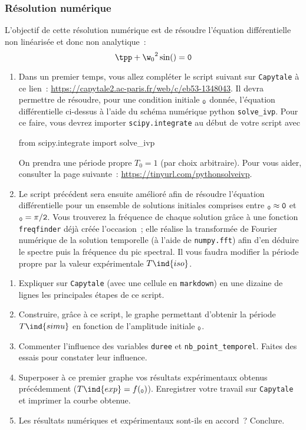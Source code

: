 \documentclass[a4paper, 11pt, final, garamond]{book}
\begin{document}
\subsubsection{Résolution numérique}

L'objectif de cette résolution numérique est de résoudre l'équation
différentielle non linéarisée et donc non analytique~: 
\[
    \tpp + {\w_0}^2 \sin(\tt) = 0
\]

\begin{enumerate}
    \item Dans un premier temps, vous allez compléter le script suivant sur
        \texttt{Capytale} à ce lien~:
        \url{https://capytale2.ac-paris.fr/web/c/eb53-1348043}. Il devra
        permettre de résoudre, pour une condition initiale $\tt_0$ donnée,
        l'équation différentielle ci-dessus à l'aide du schéma numérique python
        \texttt{solve\_ivp}. Pour ce faire, vous devrez importer
        \texttt{scipy.integrate} au début de votre script avec 

        \begin{python}
from scipy.integrate import solve_ivp
        \end{python}

        On prendra une période propre $T_0 = 1$ (par choix arbitraire).
        \bigbreak Pour vous aider, consulter la page suivante~:
        \url{https://tinyurl.com/pythonsolveivp}.
    \item Le script précédent sera ensuite amélioré afin de résoudre l'équation
        différentielle pour un ensemble de solutions initiales comprises entre
        $\tt_0 \approx 0$ et $\tt_0 = \pi/2$. Vous trouverez la fréquence de
        chaque solution grâce à une fonction \texttt{freqfinder} déjà créée
        l'occasion~; elle réalise la transformée de Fourier numérique de
        la solution temporelle (à l'aide de \texttt{numpy.fft}) afin d'en
        déduire le spectre puis la fréquence du pic spectral. Il vous faudra
        modifier la période propre par la valeur expérimentale $T\ind{iso}$. 
\end{enumerate}

\bigskip

\begin{enumerate}[label=\sqenumi, start=13]
    \item Expliquer sur \texttt{Capytale} (avec une cellule en
        \texttt{markdown}) en une dizaine de lignes les principales étapes de ce
        script.
    \item Construire, grâce à ce script, le graphe permettant d'obtenir la
        période $T\ind{simu}$ en fonction de l'amplitude initiale $\tt_0$. 
    \item Commenter l'influence des variables \texttt{duree} et
        \texttt{nb\_point\_temporel}. Faites des essais pour constater leur
        influence.
    \item Superposer à ce premier graphe vos résultats expérimentaux obtenus
        précédemment ($T\ind{exp} = f(\tt_0)$). Enregistrer votre travail sur
        \texttt{Capytale} et imprimer la courbe obtenue. 
    \item Les résultats numériques et expérimentaux sont-ils en accord~?
        Conclure.
\end{enumerate}
\end{document}
